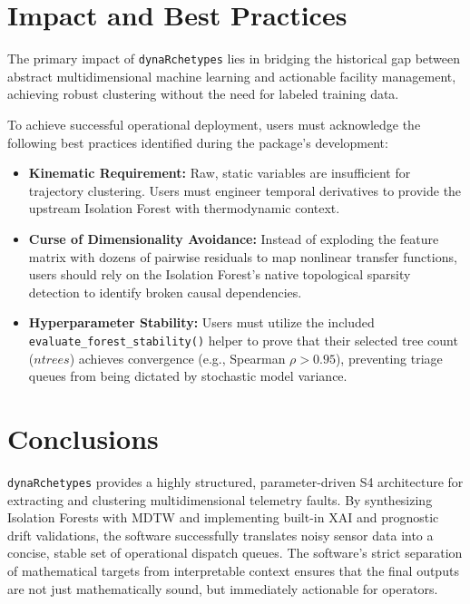 \documentclass[final,3p,times]{elsarticle}
\begin{document}
\section{Impact and Best Practices}
The primary impact of \texttt{dynaRchetypes} lies in bridging the historical gap between abstract multidimensional machine learning and actionable facility management, achieving robust clustering without the need for labeled training data. 

To achieve successful operational deployment, users must acknowledge the following best practices identified during the package's development:
\begin{itemize}
\item \textbf{Kinematic Requirement:} Raw, static variables are insufficient for trajectory clustering. Users must engineer temporal derivatives to provide the upstream Isolation Forest with thermodynamic context.
\item \textbf{Curse of Dimensionality Avoidance:} Instead of exploding the feature matrix with dozens of pairwise residuals to map nonlinear transfer functions, users should rely on the Isolation Forest's native topological sparsity detection to identify broken causal dependencies.
\item \textbf{Hyperparameter Stability:} Users must utilize the included \texttt{evaluate\_forest\_stability()} helper to prove that their selected tree count ($ntrees$) achieves convergence (e.g., Spearman $\rho > 0.95$), preventing triage queues from being dictated by stochastic model variance.
\end{itemize}

\section{Conclusions}

\texttt{dynaRchetypes} provides a highly structured, parameter-driven S4 architecture for extracting and clustering multidimensional telemetry faults. By synthesizing Isolation Forests with MDTW and implementing built-in XAI and prognostic drift validations, the software successfully translates noisy sensor data into a concise, stable set of operational dispatch queues. The software’s strict separation of mathematical targets from interpretable context ensures that the final outputs are not just mathematically sound, but immediately actionable for operators.



\end{document}
